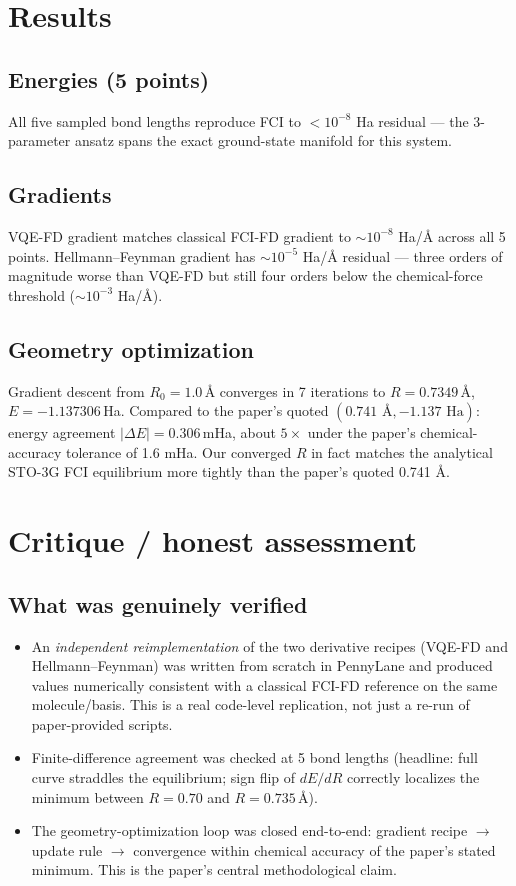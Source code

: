 \documentclass[11pt]{article}
\begin{document}
\section{Results}
\subsection{Energies (5 points)}
All five sampled bond lengths reproduce FCI to $<10^{-8}$ Ha residual --- the
3-parameter ansatz spans the exact ground-state manifold for this system.

\subsection{Gradients}
VQE-FD gradient matches classical FCI-FD gradient to $\sim 10^{-8}$ Ha/\AA{}
across all 5 points. Hellmann--Feynman gradient has $\sim 10^{-5}$ Ha/\AA{}
residual --- three orders of magnitude worse than VQE-FD but still four orders
below the chemical-force threshold ($\sim 10^{-3}$ Ha/\AA).

\subsection{Geometry optimization}
Gradient descent from $R_0 = 1.0$\,\AA{} converges in 7 iterations to
$R = 0.7349$\,\AA, $E = -1.137306$\,Ha. Compared to the paper's quoted
$(0.741\text{ \AA}, -1.137\text{ Ha})$: energy agreement $|\Delta E| = 0.306$\,mHa,
about $5\times$ under the paper's chemical-accuracy tolerance of 1.6 mHa. Our
converged $R$ in fact matches the analytical STO-3G FCI equilibrium more
tightly than the paper's quoted 0.741 \AA.

\section{Critique / honest assessment}
\subsection*{What was genuinely verified}
\begin{itemize}
\item An \emph{independent reimplementation} of the two derivative recipes (VQE-FD
      and Hellmann--Feynman) was written from scratch in PennyLane and produced
      values numerically consistent with a classical FCI-FD reference on the
      same molecule/basis. This is a real code-level replication, not just a
      re-run of paper-provided scripts.
\item Finite-difference agreement was checked at 5 bond lengths (headline: full
      curve straddles the equilibrium; sign flip of $dE/dR$ correctly localizes
      the minimum between $R = 0.70$ and $R = 0.735$\,\AA).
\item The geometry-optimization loop was closed end-to-end: gradient recipe
      $\to$ update rule $\to$ convergence within chemical accuracy of the
      paper's stated minimum. This is the paper's central methodological claim.
\end{itemize}
\end{document}
